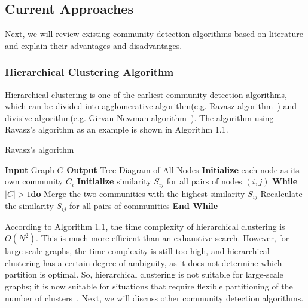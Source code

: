 \documentclass[ %
                    author={Tengyao Tu},
                supervisor={Dr. James Pope},
                    degree={MSc},
                     title={A New Perspective on Graph Community Detection: Combining Traditional Methods with Deep Learning Approaches},
                  subtitle={Applying to Telecom Networks and Diverse Datasets},
                      type={},
                      year={2024}]{dissertation}
\begin{document}
\subsection{Current Approaches}
Next, we will review existing community detection algorithms based on literature and explain their advantages and disadvantages.
\subsubsection{Hierarchical Clustering Algorithm}
Hierarchical clustering is one of the earliest community detection algorithms, which can be divided into agglomerative algorithm(e.g. Ravasz algorithm~\cite{ravasz2002hierarchical}) and divisive algorithm(e.g. Girvan-Newman algorithm~\cite{newman2004finding}). The algorithm using Ravasz's algorithm as an example is shown in Algorithm 1.1.
\begin{algorithm}[ht!]
\caption{Ravasz's algorithm} 
\begin{framedalgorithm}[ht!]
    \State \textbf{Input} Graph $G$\newline
    \State \textbf{Output} Tree Diagram of All Nodes\newline
   \State \textbf{Initialize} each node as its own community $C_{i}$\newline
    \State \textbf{Initialize} similarity $S_{ij}$ for all pairs of nodes $(i, j)$\newline
    \State \textbf{While} $|C| > 1$\textbf{do}\newline
    \State \phantom{hold} Merge the two communities with the highest similarity $S_{ij}$\newline
    \State \phantom{hold}Recalculate the similarity $S_{ij}$ for all pairs of communities\newline
    \State \textbf{End While}\newline
\end{framedalgorithm}
\end{algorithm}
According to Algorithm 1.1, the time complexity of hierarchical clustering is $O(N^2)$. This is much more efficient than an exhaustive search. However, for large-scale graphs, the time complexity is still too high, and hierarchical clustering has a certain degree of ambiguity, as it does not determine which partition is optimal. So, hierarchical clustering is not suitable for large-scale graphs; it is now suitable for situations that require flexible partitioning of the number of clusters~\cite{li2019community}. Next, we will discuss other community detection algorithms.
\end{document}

